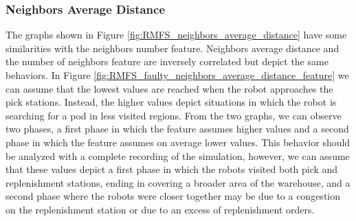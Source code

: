 \documentclass[../../Thesis.tex]{subfiles}
\begin{document}
			\subsubsection{Neighbors Average Distance}
				The graphs shown in Figure \ref{fig:RMFS_neighbors_average_distance} have some similarities with the neighbors number feature. Neighbors average distance and the number of neighbors feature are inversely correlated but depict the same behaviors. In Figure \ref{fig:RMFS_faulty_neighbors_average_distance_feature} we can assume that the lowest values are reached when the robot approaches the pick stations. Instead, the higher values depict situations in which the robot is searching for a pod in less visited regions. From the two graphs, we can observe two phases, a first phase in which the feature assumes higher values and a second phase in which the feature assumes on average lower values. This behavior should be analyzed with a complete recording of the simulation, however, we can assume that these values depict a first phase in which the robots visited both pick and replenishment stations, ending in covering a broader area of the warehouse, and a second phase where the robots were closer together may be due to a congestion on the replenishment station or due to an excess of replenishment orders.
\end{document}
